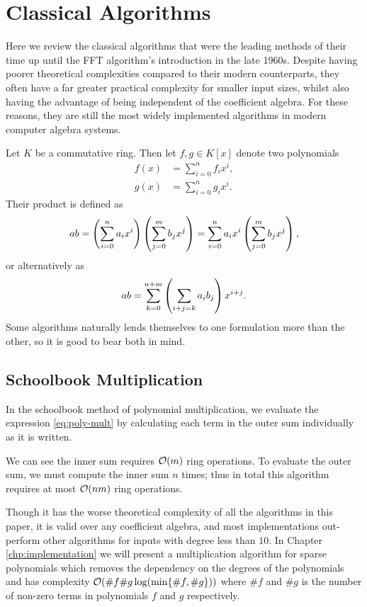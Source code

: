 \chapter{Classical Algorithms}\label{chp:classical}

Here we review the classical algorithms that were the leading methods of their time up until the FFT algorithm's introduction in the late 1960s. Despite having poorer theoretical complexities compared to their modern counterparts, they often have a far greater practical complexity for smaller input sizes, whilst also having the advantage of being independent of the coefficient algebra. For these reasons, they are still the most widely implemented algorithms in modern computer algebra systems.

Let $K$ be a commutative ring. Then let $f, g \in K[x]$ denote two polynomials
\begin{align*}
    f(x) &= \sum^n_{i=0} f_ix^i,\\
    g(x) &= \sum^n_{i=0} g_ix^i.
\end{align*}
Their product is defined as
\begin{equation}\label{eq:poly-mult}
    ab = \left(\sum^n_{i=0} a_i x^i\right)\left(\sum^m_{j=0} b_j x^j\right) = \sum^n_{i=0} a_ix^i\left(\sum^m_{j=0} b_j x^j\right),
\end{equation}
or alternatively as
\begin{equation}\label{eq:poly-mult-conv}
    ab = \sum^{n + m}_{k=0} \left(\sum_{i + j = k}a_ib_j\right) x^{i + j}.
\end{equation}
Some algorithms naturally lends themselves to one formulation more than the other, so it is good to bear both in mind.

\section{Schoolbook Multiplication}
\label{sec:prelim-schoolbook}

In the schoolbook method of polynomial multiplication, we evaluate the expression \eqref{eq:poly-mult} by calculating each term in the outer sum individually as it is written.

We can see the inner sum requires $\mathcal O(m)$ ring operations. To evaluate the outer sum, we must compute the inner sum $n$ times; thus in total this algorithm requires at most $\mathcal O(nm)$ ring operations.

Though it has the worse theoretical complexity of all the algorithms in this paper, it is valid over any coefficient algebra, and most implementations out-perform other algorithms for inputs with degree less than $10$. In Chapter \ref{chp:implementation} we will present a multiplication algorithm for sparse polynomials which removes the dependency on the degrees of the polynomials and has complexity $\mathcal O(\# f \# g \log(\min\{\# f, \# g\}))$ where $\# f$ and $\# g$ is the number of non-zero terms in polynomials $f$ and $g$ respectively.

